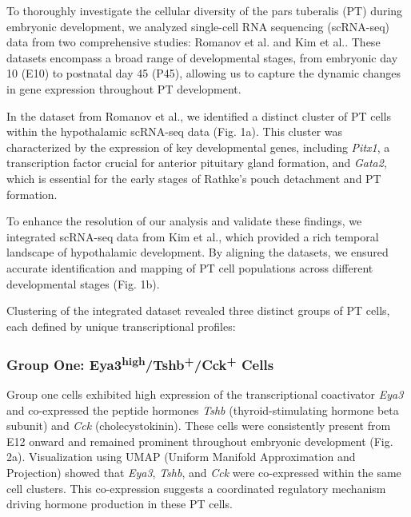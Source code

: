 \documentclass[
  number,
  preprint]{elsarticle}
\begin{document}
To thoroughly investigate the cellular diversity of the pars tuberalis
(PT) during embryonic development, we analyzed single-cell RNA
sequencing (scRNA-seq) data from two comprehensive studies: Romanov et
al.\citep{romanovMolecularDesignHypothalamus2020} and Kim et
al.\citep{kim2020}. These datasets encompass a broad range of
developmental stages, from embryonic day 10 (E10) to postnatal day 45
(P45), allowing us to capture the dynamic changes in gene expression
throughout PT development.

In the dataset from Romanov et al., we identified a distinct cluster of
PT cells within the hypothalamic scRNA-seq data (Fig. 1a). This cluster
was characterized by the expression of key developmental genes,
including \emph{Pitx1}, a transcription factor crucial for anterior
pituitary gland
formation\citep{szetoPOTXPIT1interactingHomeodomain1996}, and
\emph{Gata2}, which is essential for the early stages of Rathke's pouch
detachment and PT formation\citep{dasenReciprocalInteractionsPit11999}.

To enhance the resolution of our analysis and validate these findings,
we integrated scRNA-seq data from Kim et al., which provided a rich
temporal landscape of hypothalamic development. By aligning the
datasets, we ensured accurate identification and mapping of PT cell
populations across different developmental stages (Fig. 1b).

Clustering of the integrated dataset revealed three distinct groups of
PT cells, each defined by unique transcriptional profiles:

\subsubsection{\texorpdfstring{\textbf{Group One:
Eya3\textsuperscript{high}/Tshb\textsuperscript{+}/Cck\textsuperscript{+}
Cells}}{Group One: Eya3high/Tshb+/Cck+ Cells}}\label{group-one-eya3hightshbcck-cells}

Group one cells exhibited high expression of the transcriptional
coactivator \emph{Eya3} and co-expressed the peptide hormones
\emph{Tshb} (thyroid-stimulating hormone beta subunit) and \emph{Cck}
(cholecystokinin). These cells were consistently present from E12 onward
and remained prominent throughout embryonic development (Fig. 2a).
Visualization using UMAP (Uniform Manifold Approximation and Projection)
showed that \emph{Eya3}, \emph{Tshb}, and \emph{Cck} were co-expressed
within the same cell clusters. This co-expression suggests a coordinated
regulatory mechanism driving hormone production in these PT cells.
\end{document}
